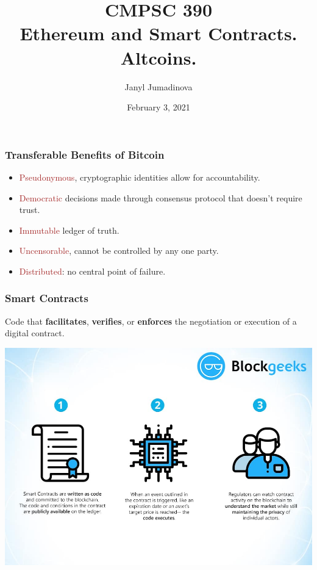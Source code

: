 \documentclass{beamer}
\title{CMPSC 390 \\ Ethereum and Smart Contracts. Altcoins.}
\author{Janyl Jumadinova}
\date{February 3, 2021}
\begin{document}
\begin{frame}
  \titlepage
\end{frame}

\begin{frame}
  \frametitle{Transferable Benefits of Bitcoin }
	\begin{itemize}
		\item \textcolor{brown}{Pseudonymous}, cryptographic identities allow  for accountability. \pause
		\item \textcolor{brown}{Democratic} decisions made through consensus  protocol that doesn't require trust. \pause
		\item \textcolor{brown}{Immutable} ledger of truth. \pause
		\item \textcolor{brown}{Uncensorable}, cannot be controlled by any one party. \pause
		\item \textcolor{brown}{Distributed}: no central point of failure.

	\end{itemize}
\end{frame}
\begin{frame}
  \frametitle{Smart Contracts}
  Code that \textbf{facilitates}, \textbf{verifies}, or \textbf{enforces} the negotiation or execution of a digital contract.

 	\centering
	\includegraphics[scale=0.28]{smart.jpg}
\end{frame}
\end{document}
